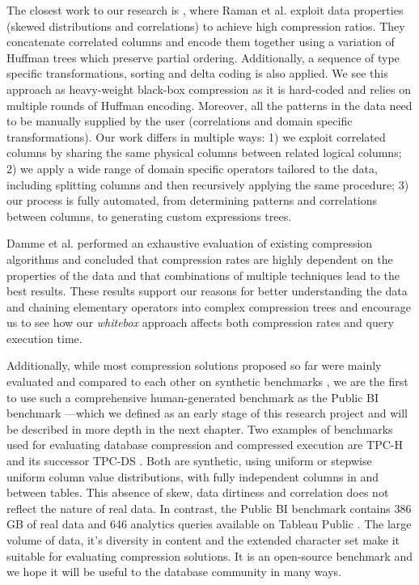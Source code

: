 The closest work to our research is \cite{raman2006wring}, where Raman et al. exploit data properties (skewed distributions and correlations) to achieve high compression ratios. They concatenate correlated columns and encode them together using a variation of Huffman trees which preserve partial ordering. Additionally, a sequence of type specific transformations, sorting and delta coding is also applied. We see this approach as heavy-weight black-box compression as it is hard-coded and relies on multiple rounds of Huffman encoding. Moreover, all the patterns in the data need to be manually supplied by the user (correlations and domain specific transformations). Our work differs in multiple ways: 1) we exploit correlated columns by sharing the same physical columns between related logical columns; 2) we apply a wide range of domain specific operators tailored to the data, including splitting columns and then recursively applying the same procedure; 3) our process is fully automated, from determining patterns and correlations between columns, to generating custom expressions trees.

Damme et al. \cite{damme2017lightweight} performed an exhaustive evaluation of existing compression algorithms and concluded that compression rates are highly dependent on the properties of the data and that combinations of multiple techniques lead to the best results. These results support our reasons for better understanding the data and chaining elementary operators into complex compression trees and encourage us to see how our \textit{whitebox} approach affects both compression rates and query execution time.

Additionally, while most compression solutions proposed so far were mainly evaluated and compared to each other on synthetic benchmarks \cite{abadi2006integrating,zukowski2006super,lee2014joins,lang2016data,raman2013db2}, we are the first to use such a comprehensive human-generated benchmark as the Public BI benchmark \cite{pbib}---which we defined as an early stage of this research project and will be described in more depth in the next chapter. Two examples of benchmarks used for evaluating database compression and compressed execution are TPC-H \cite{boncz2013tpc} and its successor TPC-DS \cite{nambiar2006making}. Both are synthetic, using uniform or stepwise uniform column value distributions, with fully independent columns in and between tables. This absence of skew, data dirtiness and correlation does not reflect the nature of real data. In contrast, the Public BI benchmark contains 386 GB of real data and 646 analytics queries available on Tableau Public \cite{vogelsgesang2018get, tableaupublic}. The large volume of data, it’s diversity in content and the extended character set make it suitable for evaluating compression solutions. It is an open-source benchmark and we hope it will be useful to the database community in many ways.

